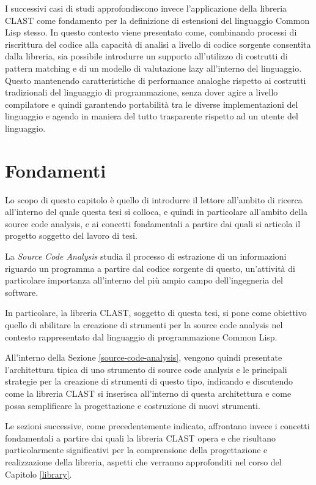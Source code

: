 \documentclass{book}
\begin{document}
I successivi casi di studi approfondiscono invece l’applicazione della libreria
CLAST come fondamento per la definizione di estensioni del linguaggio Common
Lisp stesso. In questo contesto viene presentato come, combinando processi di
riscrittura del codice alla capacità di analisi a livello di codice sorgente
consentita dalla libreria, sia possibile introdurre un supporto all’utilizzo di
costrutti di pattern matching e di un modello di valutazione lazy all’interno
del linguaggio. Questo mantenendo caratteristiche di performance analoghe
rispetto ai costrutti tradizionali del linguaggio di programmazione, senza dover
agire a livello compilatore e quindi garantendo portabilità tra le diverse
implementazioni del linguaggio e agendo in maniera del tutto trasparente
rispetto ad un utente del linguaggio.

\begingroup
\let\clearpage\relax

\chapter{Fondamenti}

Lo scopo di questo capitolo è quello di introdurre il lettore all’ambito di
ricerca all’interno del quale questa tesi si colloca, e quindi in particolare
all’ambito della source code analysis, e ai concetti fondamentali a partire dai
quali si articola il progetto soggetto del lavoro di tesi.

La \textit{Source Code Analysis} studia il processo di estrazione di un
informazioni riguardo un programma a partire dal codice sorgente di questo,
un’attività di particolare importanza all'interno del più ampio campo
dell'ingegneria del software.

In particolare, la libreria CLAST, soggetto di questa tesi, si pone come
obiettivo quello di abilitare la creazione di strumenti per la source code
analysis nel contesto rappresentato dal linguaggio di programmazione Common
Lisp.

All'interno della Sezione \ref{source-code-analysis}, vengono quindi presentate
l'architettura tipica di uno strumento di source code analysis e le principali
strategie per la creazione di strumenti di questo tipo, indicando e discutendo
come la libreria CLAST si inserisca all'interno di questa architettura e come
possa semplificare la progettazione e costruzione di nuovi strumenti.

Le sezioni successive, come precedentemente indicato, affrontano invece i
concetti fondamentali a partire dai quali la libreria CLAST opera e che
risultano particolarmente significativi per la comprensione della progettazione
e realizzazione della libreria, aspetti che verranno approfonditi nel corso del
Capitolo \ref{library}.
\end{document}
